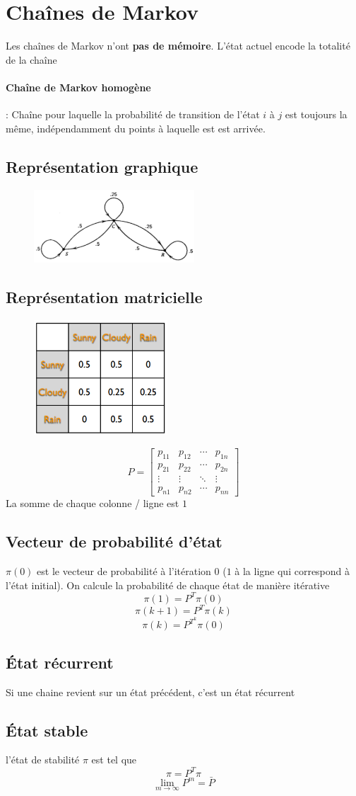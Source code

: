 \documentclass[resume]{subfiles}
\begin{document}
\section{Chaînes de Markov}
Les chaînes de Markov n'ont \textbf{pas de mémoire}. L'état actuel encode la totalité de la chaîne
\paragraph{Chaîne de Markov homogène} : Chaîne pour laquelle la probabilité de transition de l'état $i$ à $j$ est toujours la même, indépendamment du points à laquelle est est arrivée.
\subsection{Représentation graphique}
\begin{figure}[H]
\centering
\includegraphics[width=6cm]{img_15.png}
\end{figure}
\subsection{Représentation matricielle}
\begin{figure}[H]
\centering
\includegraphics[width=5cm]{img_16.png}
\end{figure}
$$P=\begin{bmatrix}
p_{11} & p_{12} & \cdots & p_{1n}\\
p_{21} & p_{22} & \cdots & p_{2n}\\
\vdots & \vdots & \ddots & \vdots\\
p_{n1} & p_{n2} & \cdots & p_{nn}
\end{bmatrix}$$
La somme de chaque colonne / ligne est $1$
\subsection{Vecteur de probabilité d'état}
$\pi(0)$ est le vecteur de probabilité à l'itération 0 ($1$ à la ligne qui correspond à l'état initial). On calcule la probabilité de chaque état de manière itérative
$$\pi(1)=P^{T}\pi(0)$$
$$\pi(k+1)=P^{T}\pi(k)$$
$$\pi(k)=P^{T^{k}}\pi(0)$$
\subsection{État récurrent}
Si une chaine revient sur un état précédent, c'est un état récurrent
\subsection{État stable}
l'état de stabilité $\pi$ est tel que
$$\pi = P^T\pi$$
$$\lim_{m\to\infty}P^m=\bar{P}$$
\end{document}
